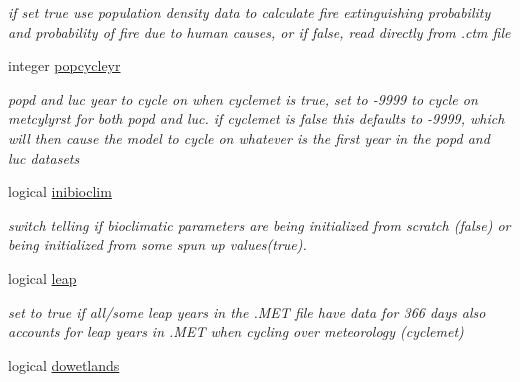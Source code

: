\begin{DoxyCompactItemize}
\begin{DoxyCompactList}\small\item\em if set true use population density data to calculate fire extinguishing probability and probability of fire due to human causes, or if false, read directly from .ctm file \end{DoxyCompactList}\item 
\hypertarget{structctem__statevars_1_1ctem__switches_ae491b1a8de9e19ed30020e33e7bca5d0}{}integer \hyperlink{structctem__statevars_1_1ctem__switches_ae491b1a8de9e19ed30020e33e7bca5d0}{popcycleyr}\label{structctem__statevars_1_1ctem__switches_ae491b1a8de9e19ed30020e33e7bca5d0}

\begin{DoxyCompactList}\small\item\em popd and luc year to cycle on when cyclemet is true, set to -\/9999 to cycle on metcylyrst for both popd and luc. if cyclemet is false this defaults to -\/9999, which will then cause the model to cycle on whatever is the first year in the popd and luc datasets \end{DoxyCompactList}\item 
\hypertarget{structctem__statevars_1_1ctem__switches_a363efc622307abfadb56494f98bf4b35}{}logical \hyperlink{structctem__statevars_1_1ctem__switches_a363efc622307abfadb56494f98bf4b35}{inibioclim}\label{structctem__statevars_1_1ctem__switches_a363efc622307abfadb56494f98bf4b35}

\begin{DoxyCompactList}\small\item\em switch telling if bioclimatic parameters are being initialized from scratch (false) or being initialized from some spun up values(true). \end{DoxyCompactList}\item 
\hypertarget{structctem__statevars_1_1ctem__switches_a0d2cee5988b9acc49829041803774a2d}{}logical \hyperlink{structctem__statevars_1_1ctem__switches_a0d2cee5988b9acc49829041803774a2d}{leap}\label{structctem__statevars_1_1ctem__switches_a0d2cee5988b9acc49829041803774a2d}

\begin{DoxyCompactList}\small\item\em set to true if all/some leap years in the .M\+E\+T file have data for 366 days also accounts for leap years in .M\+E\+T when cycling over meteorology (cyclemet) \end{DoxyCompactList}\item 
\hypertarget{structctem__statevars_1_1ctem__switches_a8784d0eb86363cf7060f8f0e5a882558}{}logical \hyperlink{structctem__statevars_1_1ctem__switches_a8784d0eb86363cf7060f8f0e5a882558}{dowetlands}\label{structctem__statevars_1_1ctem__switches_a8784d0eb86363cf7060f8f0e5a882558}


\end{DoxyCompactItemize}
